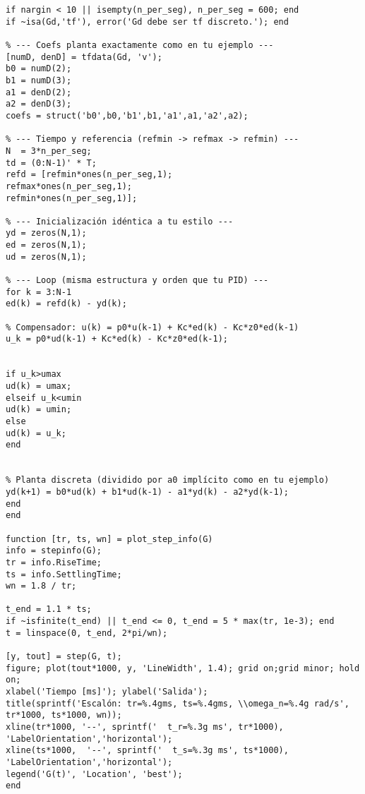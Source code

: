 \begin{lstlisting}[style=matlabstyle,caption={Funciones reutilizadas de laboratorios pasados.},label={matlab:oldfunc}]
if nargin < 10 || isempty(n_per_seg), n_per_seg = 600; end
if ~isa(Gd,'tf'), error('Gd debe ser tf discreto.'); end

% --- Coefs planta exactamente como en tu ejemplo ---
[numD, denD] = tfdata(Gd, 'v');
b0 = numD(2);
b1 = numD(3);
a1 = denD(2);
a2 = denD(3);
coefs = struct('b0',b0,'b1',b1,'a1',a1,'a2',a2);

% --- Tiempo y referencia (refmin -> refmax -> refmin) ---
N  = 3*n_per_seg;
td = (0:N-1)' * T;
refd = [refmin*ones(n_per_seg,1);
refmax*ones(n_per_seg,1);
refmin*ones(n_per_seg,1)];

% --- Inicialización idéntica a tu estilo ---
yd = zeros(N,1);
ed = zeros(N,1);
ud = zeros(N,1);

% --- Loop (misma estructura y orden que tu PID) ---
for k = 3:N-1
ed(k) = refd(k) - yd(k);

% Compensador: u(k) = p0*u(k-1) + Kc*ed(k) - Kc*z0*ed(k-1)
u_k = p0*ud(k-1) + Kc*ed(k) - Kc*z0*ed(k-1);


if u_k>umax
ud(k) = umax;
elseif u_k<umin
ud(k) = umin;
else 
ud(k) = u_k;
end


% Planta discreta (dividido por a0 implícito como en tu ejemplo)
yd(k+1) = b0*ud(k) + b1*ud(k-1) - a1*yd(k) - a2*yd(k-1);
end
end

function [tr, ts, wn] = plot_step_info(G)
info = stepinfo(G);
tr = info.RiseTime; 
ts = info.SettlingTime; 
wn = 1.8 / tr;

t_end = 1.1 * ts;
if ~isfinite(t_end) || t_end <= 0, t_end = 5 * max(tr, 1e-3); end
t = linspace(0, t_end, 2*pi/wn);

[y, tout] = step(G, t);
figure; plot(tout*1000, y, 'LineWidth', 1.4); grid on;grid minor; hold on;
xlabel('Tiempo [ms]'); ylabel('Salida');
title(sprintf('Escalón: tr=%.4gms, ts=%.4gms, \\omega_n=%.4g rad/s', tr*1000, ts*1000, wn));
xline(tr*1000, '--', sprintf('  t_r=%.3g ms', tr*1000), 'LabelOrientation','horizontal');
xline(ts*1000,  '--', sprintf('  t_s=%.3g ms', ts*1000), 'LabelOrientation','horizontal');
legend('G(t)', 'Location', 'best');
end
\end{lstlisting}

